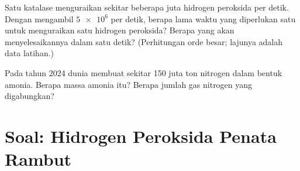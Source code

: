 \begin{exercise}[$\star\star\star$]\label{exo:g12:catalysis:14}
Satu  katalase menguraikan sekitar beberapa juta 
hidrogen peroksida per detik. Dengan mengambil $\num{5e6}$ per detik,
berapa lama waktu yang diperlukan satu   untuk menguraikan
satu  hidrogen peroksida? Berapa   yang akan
menyelesaikannya dalam satu detik? (Perhitungan orde besar; lajunya
adalah data latihan.)
\end{exercise}

\begin{exercise}[$\star\star\star$]\label{exo:g12:catalysis:15}
Pada tahun 2024 dunia membuat sekitar 150 juta ton nitrogen dalam bentuk
amonia. Berapa massa amonia itu? Berapa jumlah gas nitrogen yang
digabungkan?
\end{exercise}

\section{Soal: Hidrogen Peroksida Penata Rambut}

